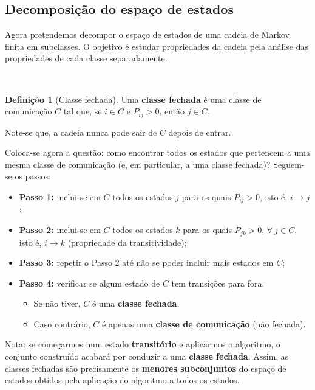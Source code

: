 \documentclass[
  11pt,
  a4paper,
]{book}
\providecommand{\tightlist}{%
  \setlength{\itemsep}{0pt}\setlength{\parskip}{0pt}}
\theoremstyle{definition}
\newtheorem{definition}{Definição}[chapter]
\theoremstyle{definition}
\theoremstyle{definition}
\theoremstyle{definition}
\theoremstyle{remark}
\begin{document}
\subsection{Decomposição do espaço de estados}\label{decomposiuxe7uxe3o-do-espauxe7o-de-estados}

Agora pretendemos decompor o espaço de estados de uma cadeia de Markov finita em subclasses. O objetivo é estudar propriedades da cadeia pela análise das propriedades de cada classe separadamente.

\(\,\)

\begin{definition}[Classe fechada]
Uma \textbf{classe fechada} é uma classe de comunicação \(C\) tal que, se \(i \in C\) e \(P_{ij} > 0\), então \(j \in C\).

Note-se que, a cadeia nunca pode sair de \(C\) depois de entrar.
\end{definition}

Coloca-se agora a questão: como encontrar todos os estados que pertencem a uma mesma classe de comunicação (e, em particular, a uma classe fechada)? Seguem-se os passos:

\begin{itemize}
\item
  \textbf{Passo 1:} inclui-se em \(C\) todos os estados \(j\) para os quais \(P_{ij}>0\), isto é, \(i \longrightarrow j\);
\item
  \textbf{Passo 2:} inclui-se em \(C\) todos os estados \(k\) para os quais \(P_{jk}>0\), \(\forall ~j \in C\), isto é, \(i \longrightarrow k\) (propriedade da transitividade);
\item
  \textbf{Passo 3:} repetir o Passo 2 até não se poder incluir mais estados em \(C\);
\item
  \textbf{Passo 4:} verificar se algum estado de \(C\) tem transições para fora.

  \begin{itemize}
  \tightlist
  \item
    Se não tiver, \(C\) é uma \textbf{classe fechada}.\\
  \item
    Caso contrário, \(C\) é apenas uma \textbf{classe de comunicação} (não fechada).
  \end{itemize}
\end{itemize}

Nota: se começarmos num estado \textbf{transitório} e aplicarmos o algoritmo, o conjunto construído acabará por conduzir a uma \textbf{classe fechada}. Assim, as classes fechadas são precisamente os \textbf{menores subconjuntos} do espaço de estados obtidos pela aplicação do algoritmo a todos os estados.
\end{document}
